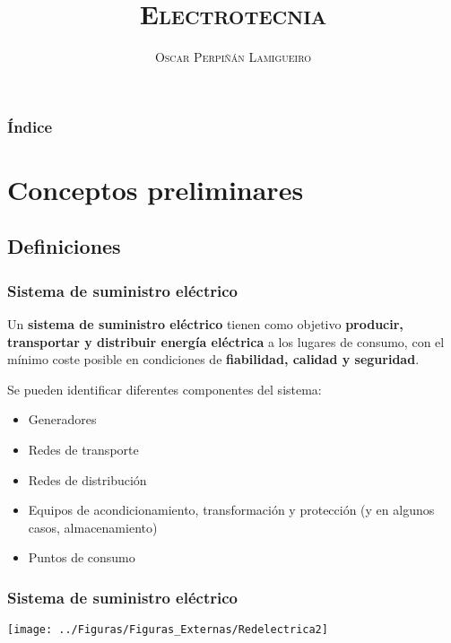 \documentclass[serif, xcolor=dvipsnames]{beamer}
\begin{document}
\title{\textsc{Electrotecnia}}


\author{\textsc{Oscar Perpiñán Lamigueiro}}
\date{}

\frame[plain]{\titlepage}


\setcounter{tocdepth}{1}%

%


\begin{frame}[plain]
\frametitle{Índice}

\tableofcontents{}


\end{frame}
\section{Conceptos preliminares}

\subsection{Definiciones}

\begin{frame}
  \frametitle{Sistema de suministro eléctrico}

  Un \textbf{sistema de suministro eléctrico} tienen como objetivo
  \textbf{producir, transportar y distribuir energía eléctrica} a los
  lugares de consumo, con el mínimo coste posible en condiciones de
  \textbf{fiabilidad, calidad y seguridad}.

  Se pueden identificar diferentes componentes del sistema:
  \begin{itemize}
  \item Generadores
  \item Redes de transporte
  \item Redes de distribución
  \item Equipos de acondicionamiento, transformación y protección (y
    en algunos casos, almacenamiento)
  \item Puntos de consumo
  \end{itemize}

\end{frame}
\begin{frame}
  \frametitle{Sistema de suministro eléctrico}

  \begin{center}
    \texttt{[image: ../Figuras/Figuras\_Externas/Redelectrica2]}
    \par\end{center}


\end{frame}
\end{document}
